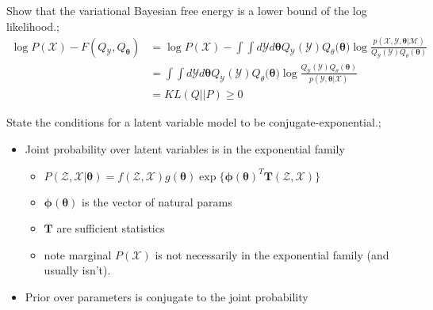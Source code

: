 \documentclass{article}
\begin{document}
Show that the variational Bayesian free energy is a lower bound of the log likelihood.; \begin{align*} \log P(\mathcal{X}) - F(Q_{\mathcal{Y}},Q_{\bm{\theta}}) &= \log P(\mathcal{X}) - \int \int d\mathcal{Y}d\bm{\theta}Q_{\mathcal{Y}}(\mathcal{Y})Q_\theta(\bm{\theta)}\log\frac{p(\mathcal{X, Y}, \bm{\theta}|\mathcal{M})}{Q_{\mathcal{Y}}(\mathcal{Y})Q_\theta(\bm{\theta})} \\ &=  \int \int d\mathcal{Y}d\bm{\theta}Q_{\mathcal{Y}}(\mathcal{Y})Q_\theta(\bm{\theta)}\log\frac{Q_{\mathcal{Y}}(\mathcal{Y})Q_\theta(\bm{\theta})}{p(\mathcal{Y}, \bm{\theta}|\mathcal{X})}\\ &= KL(Q||P) \geq 0 \end{align*}

State the conditions for a latent variable model to be conjugate-exponential.; \begin{itemize} \item Joint probability over latent variables is in the exponential family \begin{itemize} \item $P(\mathcal{Z, X}|\bm{\theta}) = f(\mathcal{Z, X})g(\bm{\theta})\exp\{\bm{\phi(\theta)}^T\bm{T}(\mathcal{Z,X})\}$ \item $\bm{\phi(\theta)}$ is the vector of natural params \item $\bm{T}$ are sufficient statistics \item note marginal $P(\mathcal{X})$ is not necessarily in the exponential family (and usually isn't).  \end{itemize} \item Prior over parameters is conjugate to the joint probability \end{itemize}
\end{document}
